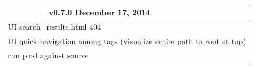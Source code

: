 \documentclass[notitlepage]{article}
\newcommand{\releasedate}{December 17, 2014}
\begin{document}
\begin{center}
\begin{tabular}{ | l | }
\hline
\LARGE\cellcolor{myblue}\textcolor{white}{khallware} v0.7.0 \releasedate{} \\
\hline
UI search\_results.html 404 \\
\hline
UI quick navigation among tags (visualize entire path to root at top) \\
\hline
run pmd against source \\
\hline

\end{tabular}
\end{center}
\end{document}
